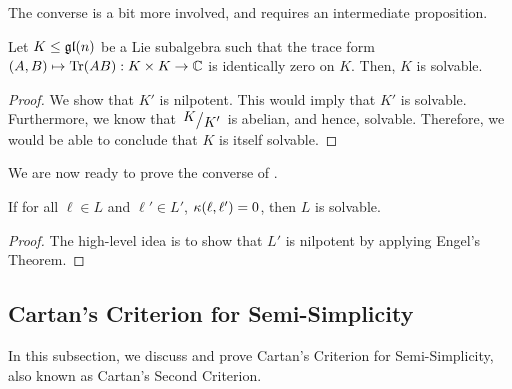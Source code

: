 The converse is a bit more involved, and requires an intermediate proposition.

\begin{boxproposition}
    Let $K \leq \mathfrak{gl}\!\left( n \right)$ be a Lie subalgebra such that the trace form $\left( A, B \right) \mapsto \operatorname{Tr}\!\left( AB \right) : K \times K \to \mathbb{C}$ is identically zero on $K$. Then, $K$ is solvable.
\end{boxproposition}
\begin{proof}
    We show that $K'$ is nilpotent. This would imply that $K'$ is solvable. Furthermore, we know that $\quotient{K}{K'}$ is abelian, and hence, solvable. Therefore, we would be able to conclude that $K$ is itself solvable. %

    
\end{proof}

We are now ready to prove the converse of .

\begin{boxlemma}
    If for all $\ell \in L$ and $\ell' \in L'$, $\kappa\!\left( \ell, \ell' \right) = 0$, then $L$ is solvable.
\end{boxlemma}
\begin{proof}
    The high-level idea is to show that $L'$ is nilpotent by applying Engel's Theorem.

    \sorry
\end{proof}

\subsection{Cartan's Criterion for Semi-Simplicity}

In this subsection, we discuss and prove Cartan's Criterion for Semi-Simplicity, also known as Cartan's Second Criterion.

